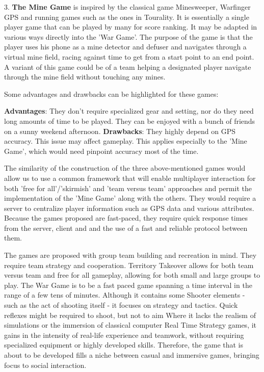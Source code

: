 3. \textbf{The Mine Game} is inspired by the classical game Minesweeper,
Warfinger GPS and running games such as the ones in Tourality. It is essentially
a single player game that can be played by many for score ranking. It may be
adapted in various ways directly into the 'War Game'. The purpose of the game is
that the player uses his phone as a mine detector and defuser and navigates
through a virtual mine field, racing against time to get from a start point to
an end point. A variant of this game could be of a team helping a designated
player navigate through the mine field without touching any mines.\newline

Some advantages and drawbacks can be highlighted for these games:\newline

\textbf{Advantages}: They don't require specialized gear and setting, nor
do they need long amounts of time to be played. They can be enjoyed with a
bunch of friends on a sunny weekend afternoon.\newline
\textbf{Drawbacks}: They highly depend on GPS accuracy. This issue may
affect gameplay. This applies especially to the 'Mine Game', which would need
pinpoint accuracy most of the time. \newline

The similarity of the construction of the three above-mentioned games would
allow us to use a common framework that will enable multiplayer interaction for
both 'free for all'/'skirmish' and 'team versus team' approaches and permit the
implementation of the 'Mine Game' along with the others. They would require a
server to centralize player information such as GPS data and various attributes.
Because the games proposed are fast-paced, they require quick response times
from the server, client and and the use of a fast and reliable protocol between
them.\newline

The games are proposed with group team building and recreation in mind. They
require team strategy and cooperation. Territory Takeover allows for both team
versus team and free for all gameplay, allowing for both small and large groups
to play. The War Game is to be a fast paced game spanning a time interval in the
range of a few tens of minutes. Although it contains some Shooter elements -
such as the act of shooting itself - it focuses on strategy and tactics. Quick
reflexes might be required to shoot, but not to aim Where it lacks the realism
of simulations or the immersion of classical computer Real Time Strategy games,
it gains in the intensity of real-life experience and teamwork, without requiring
specialized equipment or highly developed skills. Therefore, the game that is
about to be developed fills a niche between casual and immersive games, bringing
focus to social interaction.\newline

